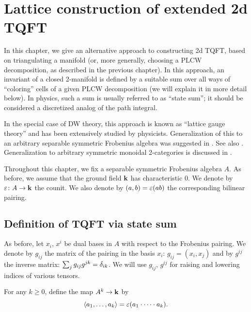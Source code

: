 \chapter{Lattice construction of extended 2d TQFT}\label{c:2d-lattice}

In this chapter, we give an alternative approach to constructing 2d TQFT, based
on triangulating a manifold (or, more generally, choosing a PLCW decomposition,
as described in the previous chapter). In this approach, an invariant of a
closed 2-manifold is defined by a suitable sum over all ways of ``coloring''
cells of a given PLCW decomposition (we will explain it in more detail below).
In physics, such a sum is usually referred to as ``state sum''; it should be
considered a discretized analog of the path integral.

In the special case of DW theory, this approach is known as ``lattice gauge
theory'' and has been extensively studied by physicists. Generalization of
this to an arbitrary separable symmetric Frobenius algebra was suggested in
. See also . Generalization to arbitrary symmetric
monoidal 2-categories is discussed in .

Throughout this chapter, we fix a separable symmetric Frobenius algebra
$A$. As before, we assume that the ground field $\mathbf{k}$ has characteristic 0.
We denote by $\varepsilon \colon A\to \mathbf{k}$ the counit. We also denote by
$(a,b)=\varepsilon(ab)$ the corresponding bilinear pairing.

\section{Definition of TQFT via state sum}\label{s:state-sum}
As before, let $x_i$, $x^i$ be dual bases in $A$ with respect to the
Frobenius pairing. We denote by $g_{ij}$ the matrix of the pairing in
the basis $x_i$: $g_{ij}=(x_i,x_j)$ and by $g^{ij}$ the inverse matrix:
$\sum_{j} g_{ij}g^{jk}=\delta_{ik}$. We will use $g_{ij}$, $g^{ij}$ for
raising and lowering indices of various tensors.

For any $k \ge 0$, define the map $A^k\to \mathbf{k}$ by
\begin{equation}\label{e:k-pairing}
\langle a_1, \dots, a_k\rangle = \varepsilon (a_1\cdot \dots \cdot a_k).
\end{equation}

